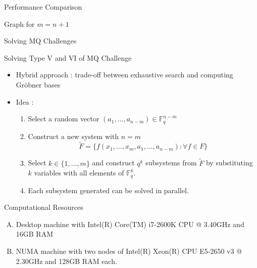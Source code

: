 \documentclass{beamer}
\newcommand{\Field}{\mathbb{F}}
\newcommand{\FField}[1]{\Field_{#1}}
\newcommand{\Grobner}{Gr\"{o}bner }
\begin{document}
\begin{section}{Performance Comparison}
\begin{frame}{Graph for $m = n + 1$}
  \end{frame}
\end{section} %

\begin{section}{Solving MQ Challenges}

  \begin{frame}{Solving Type V and VI of MQ Challenge}
    \begin{itemize}
    \item Hybrid approach : trade-off between exhaustive search and
      computing \Grobner bases
    \item Idea :
      \begin{enumerate}
      \item Select a random vector
        $(a_1, \ldots, a_{n-m}) \in \FField{q}^{n-m}$
      \item Construct a new system with $n=m$
        $$
        \tilde{F} = \{ f(x_1, \ldots, x_m, a_1, \ldots, a_{n-m}) :
        \forall f \in F \}
        $$
      \item Select $k \in \{ 1, \ldots, m\}$ and construct $q^k$
        subsystems from $\tilde{F}$ by substituting $k$ variables with
        all elements of $\FField{q}^k$.
      \item Each subsystem generated can be solved in parallel.
      \end{enumerate}
    \end{itemize}
  \end{frame}

  \begin{frame}{Computational Resources}

    \begin{enumerate}[A)]
    \item<1-> Desktop machine with Intel(R) Core(TM) i7-2600K CPU @
      3.40GHz and 16GB RAM
    \item<2-> NUMA machine with two nodes of Intel(R) Xeon(R) CPU
      E5-2650 v3 @ 2.30GHz and 128GB RAM each.
    \end{enumerate}
  \end{frame}


\end{section}
\end{document}
